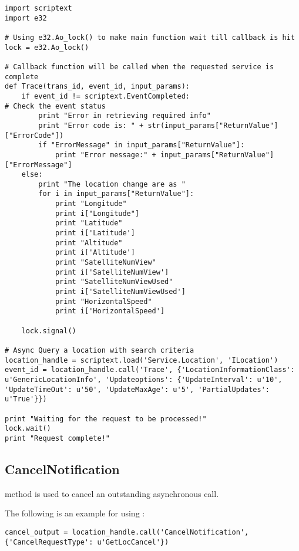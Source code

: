 \begin{verbatim}
import scriptext
import e32

# Using e32.Ao_lock() to make main function wait till callback is hit
lock = e32.Ao_lock()

# Callback function will be called when the requested service is complete
def Trace(trans_id, event_id, input_params):
    if event_id != scriptext.EventCompleted:   
# Check the event status
        print "Error in retrieving required info"
        print "Error code is: " + str(input_params["ReturnValue"]["ErrorCode"])
        if "ErrorMessage" in input_params["ReturnValue"]:
            print "Error message:" + input_params["ReturnValue"]["ErrorMessage"]
    else:
        print "The location change are as "
        for i in input_params["ReturnValue"]:
            print "Longitude"
            print i["Longitude"]
            print "Latitude"
            print i['Latitude']
            print "Altitude"
            print i['Altitude']
            print "SatelliteNumView"
            print i['SatelliteNumView']
            print "SatelliteNumViewUsed"
            print i['SatelliteNumViewUsed']
            print "HorizontalSpeed"
            print i['HorizontalSpeed']

    lock.signal()

# Async Query a location with search criteria
location_handle = scriptext.load('Service.Location', 'ILocation')
event_id = location_handle.call('Trace', {'LocationInformationClass': u'GenericLocationInfo', 'Updateoptions': {'UpdateInterval': u'10', 'UpdateTimeOut': u'50', 'UpdateMaxAge': u'5', 'PartialUpdates': u'True'}})

print "Waiting for the request to be processed!"
lock.wait()
print "Request complete!"
\end{verbatim}

\subsection{CancelNotification}
\label{subsec:localcancelnotify}

 method is used to cancel an outstanding asynchronous call.

The following is an example for using :

\begin{verbatim}
cancel_output = location_handle.call('CancelNotification', {'CancelRequestType': u'GetLocCancel'})
\end{verbatim}

